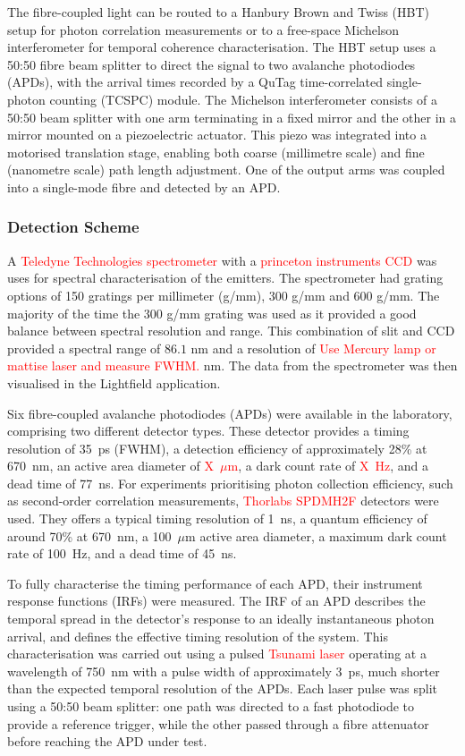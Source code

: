 The fibre-coupled light can be routed to a Hanbury Brown and Twiss (HBT) setup for photon correlation measurements or to a free-space Michelson interferometer for temporal coherence characterisation. The HBT setup uses a 50:50 fibre beam splitter to direct the signal to two avalanche photodiodes (APDs), with the arrival times recorded by a QuTag time-correlated single-photon counting (TCSPC) module. The Michelson interferometer consists of a 50:50 beam splitter with one arm terminating in a fixed mirror and the other in a mirror mounted on a piezoelectric actuator. This piezo was integrated into a motorised translation stage, enabling both coarse (millimetre scale) and fine (nanometre scale) path length adjustment. One of the output arms was coupled into a single-mode fibre and detected by an APD.

\subsubsection{Detection Scheme}

A \textcolor{red}{Teledyne Technologies spectrometer} with a \textcolor{red}{princeton instruments CCD} was uses for spectral characterisation of the emitters. The spectrometer had grating options of 150 gratings per millimeter (g/mm), 300 g/mm and 600 g/mm. The majority of the time the 300 g/mm grating was used as it provided a good balance between spectral resolution and range. This combination of slit and CCD provided a spectral range of $86.1$ nm and a resolution of \textcolor{red}{Use Mercury lamp or mattise laser and measure FWHM.} nm. The data from the spectrometer was then visualised in the Lightfield application.



Six fibre-coupled avalanche photodiodes (APDs) were available in the laboratory, comprising two different detector types. These detector provides a timing resolution of 35~ps (FWHM), a detection efficiency of approximately 28\% at 670~nm, an active area diameter of \textcolor{red}{X~$\mu$m}, a dark count rate of \textcolor{red}{X~Hz}, and a dead time of 77~ns. For experiments prioritising photon collection efficiency, such as second-order correlation measurements, \textcolor{red}{Thorlabs SPDMH2F} detectors were used. They offers a typical timing resolution of 1~ns, a quantum efficiency of around 70\% at 670~nm, a 100~$\mu$m active area diameter, a maximum dark count rate of 100~Hz, and a dead time of 45~ns.

To fully characterise the timing performance of each APD, their instrument response functions (IRFs) were measured. The IRF of an APD describes the temporal spread in the detector’s response to an ideally instantaneous photon arrival, and defines the effective timing resolution of the system. This characterisation was carried out using a pulsed \textcolor{red}{Tsunami laser} operating at a wavelength of 750~nm with a pulse width of approximately 3~ps, much shorter than the expected temporal resolution of the APDs. Each laser pulse was split using a 50:50 beam splitter: one path was directed to a fast photodiode to provide a reference trigger, while the other passed through a fibre attenuator before reaching the APD under test.

